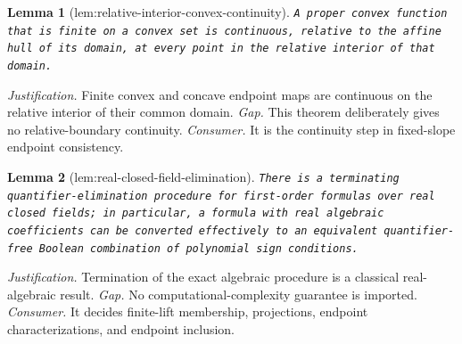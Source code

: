 \documentclass{article}
\newtheorem{lemma}{Lemma}
\begin{document}
\begin{lemma}[lem:relative-interior-convex-continuity]\label{lem:relative-interior-convex-continuity}
\texttt{A proper convex function that is finite on a convex set is continuous,\allowbreak{}
relative to the affine hull of its domain,\allowbreak{} at every point in the relative
interior of that domain.}
\end{lemma}
\par\smallskip\noindent \textit{Justification.} Finite convex and concave endpoint maps are continuous on the relative interior of their common domain. \textit{Gap.} This theorem deliberately gives no relative-boundary continuity. \textit{Consumer.} It is the continuity step in fixed-slope endpoint consistency.

\begin{lemma}[lem:real-closed-field-elimination]\label{lem:real-closed-field-elimination}
\texttt{There is a terminating quantifier-\allowbreak{}elimination procedure for first-\allowbreak{}order
formulas over real closed fields;\allowbreak{} in particular,\allowbreak{} a formula with real algebraic
coefficients can be converted effectively to an equivalent quantifier-\allowbreak{}free
Boolean combination of polynomial sign conditions.}
\end{lemma}
\par\smallskip\noindent \textit{Justification.} Termination of the exact algebraic procedure is a classical real-algebraic result. \textit{Gap.} No computational-complexity guarantee is imported. \textit{Consumer.} It decides finite-lift membership, projections, endpoint characterizations, and endpoint inclusion.
\end{document}
